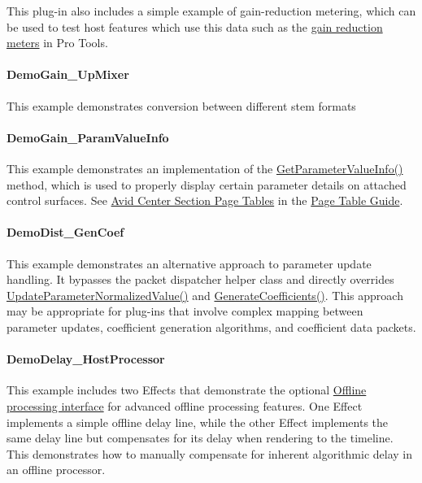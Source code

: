 This plug-\/in also includes a simple example of gain-\/reduction metering, which can be used to test host features which use this data such as the \hyperlink{a00360_subsubsection__external_metering_and_internal_clip_}{gain reduction meters} in Pro Tools.\hypertarget{a00376_DemoGain_UpMixer}{}\paragraph{Demo\+Gain\+\_\+\+Up\+Mixer}\label{a00376_DemoGain_UpMixer}
This example demonstrates conversion between different stem formats\hypertarget{a00376_DemoGain_ParamValueInfo}{}\paragraph{Demo\+Gain\+\_\+\+Param\+Value\+Info}\label{a00376_DemoGain_ParamValueInfo}
This example demonstrates an implementation of the \hyperlink{a00061_a1702de6d62b5b41b6a8b2f510300392b}{Get\+Parameter\+Value\+Info()} method, which is used to properly display certain parameter details on attached control surfaces. See \hyperlink{a00363_aax_page_table_guide_04_avid_center_section_page_tables}{Avid Center Section Page Tables} in the \hyperlink{a00363}{Page Table Guide}.\hypertarget{a00376_DemoDist_GenCoef}{}\paragraph{Demo\+Dist\+\_\+\+Gen\+Coef}\label{a00376_DemoDist_GenCoef}
This example demonstrates an alternative approach to parameter update handling. It bypasses the packet dispatcher helper class and directly overrides \hyperlink{a00061_a685858711efb8634ce66c327f2865c71}{Update\+Parameter\+Normalized\+Value()} and \hyperlink{a00061_a083265b008921b6114ede387711694b7}{Generate\+Coefficients()}. This approach may be appropriate for plug-\/ins that involve complex mapping between parameter updates, coefficient generation algorithms, and coefficient data packets.\hypertarget{a00376_DemoDelay_HostProcessor}{}\paragraph{Demo\+Delay\+\_\+\+Host\+Processor}\label{a00376_DemoDelay_HostProcessor}
This example includes two Effects that demonstrate the optional \hyperlink{a00334}{Offline processing interface} for advanced offline processing features. One Effect implements a simple offline delay line, while the other Effect implements the same delay line but compensates for its delay when rendering to the timeline. This demonstrates how to manually compensate for inherent algorithmic delay in an offline processor.

